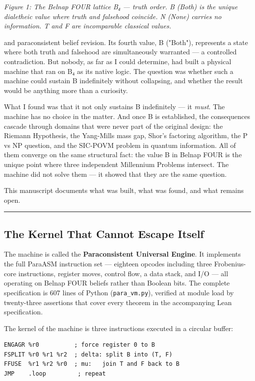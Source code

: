 \documentclass[12pt,a4paper]{article}
\begin{document}
\emph{Figure 1: The Belnap FOUR lattice B₄ --- truth order. B (Both) is the unique dialetheic value where truth and falsehood coincide. N (None) carries no information. T and F are incomparable classical values.}

and paraconsistent belief revision. Its fourth value, B ("Both"), represents a state where both truth and falsehood are simultaneously warranted --- a controlled contradiction. But nobody, as far as I could determine, had built a physical machine that ran on B₄ as its native logic. The question was whether such a machine could sustain B indefinitely without collapsing, and whether the result would be anything more than a curiosity.

What I found was that it not only sustains B indefinitely --- it \emph{must}. The machine has no choice in the matter. And once B is established, the consequences cascade through domains that were never part of the original design: the Riemann Hypothesis, the Yang-Mills mass gap, Shor's factoring algorithm, the P vs NP question, and the SIC-POVM problem in quantum information. All of them converge on the same structural fact: the value B in Belnap FOUR is the unique point where three independent Millennium Problems intersect. The machine did not solve them --- it showed that they are the same question.

This manuscript documents what was built, what was found, and what remains open.

\begin{center}
\rule{0.5\textwidth}{0.4pt}
\end{center}

\subsection{The Kernel That Cannot Escape Itself}

The machine is called the \textbf{Paraconsistent Universal Engine}. It implements the full ParaASM instruction set --- eighteen opcodes including three Frobenius-core instructions, register moves, control flow, a data stack, and I/O --- all operating on Belnap FOUR beliefs rather than Boolean bits. The complete specification is 607 lines of Python (\texttt{para\_vm.py}), verified at module load by twenty-three assertions that cover every theorem in the accompanying Lean specification.

The kernel of the machine is three instructions executed in a circular buffer:

\begin{lstlisting}
ENGAGR %r0          ; force register 0 to B
FSPLIT %r0 %r1 %r2  ; delta: split B into (T, F)
FFUSE  %r1 %r2 %r0  ; mu:   join T and F back to B
JMP    .loop         ; repeat
\end{lstlisting}
\end{document}
